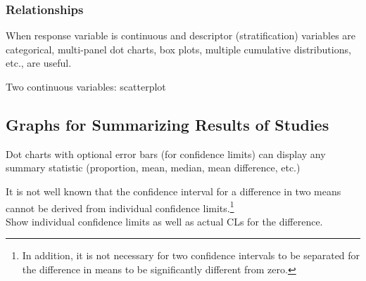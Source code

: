 \subsubsection{Relationships}
\bi
\item When response variable is continuous and descriptor
  (stratification) variables are categorical, multi-panel dot charts,
  box plots, multiple cumulative distributions, etc., are useful.
\item Two continuous variables: scatterplot
\ei


\subsection{Graphs for Summarizing Results of Studies}
\bi
\item Dot charts with optional error bars (for confidence limits) can
  display any summary statistic (proportion, mean, median, mean
  difference, etc.)
\item It is not well known that the confidence interval for a
  difference in two means cannot be derived from individual confidence
  limits.\footnote{In addition, it is not necessary for two confidence
    intervals to be separated for the difference in means to be
    significantly different from zero.} \\
  Show individual confidence limits as well as actual CLs for the
  difference.
